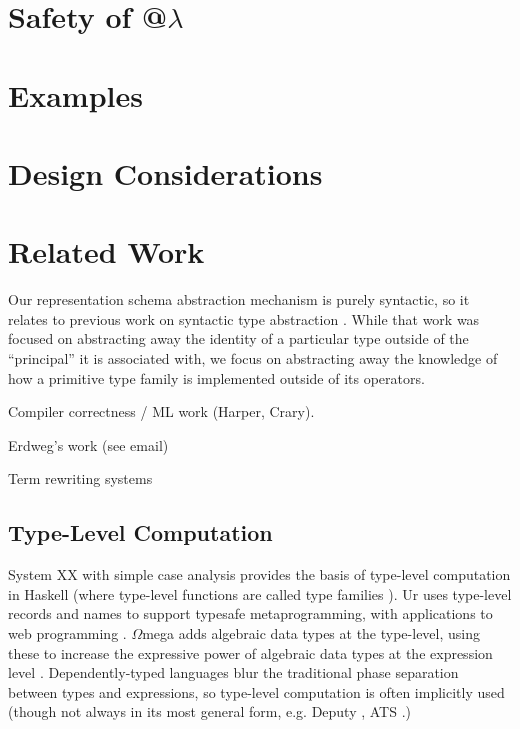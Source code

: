 \documentclass{llncs}
\begin{document}
\section{Safety of @$\lambda$}\label{safety}


\section{Examples}\label{examples}

\section{Design Considerations}\label{design}

\section{Related Work}\label{related-work}
Our representation schema abstraction mechanism is purely syntactic, so it relates to previous work on syntactic type abstraction \cite{syntypeabs}. While that work was focused on abstracting away the identity of a particular type outside of the ``principal'' it is associated with, we focus on abstracting away the knowledge of how a primitive type family is implemented outside of its operators.

Compiler correctness / ML work (Harper, Crary).

Erdweg's work (see email)

Term rewriting systems

\subsection{Type-Level Computation} %
System XX with simple case analysis provides the basis of type-level computation in Haskell (where type-level functions are called type families \cite{Chakravarty:2005:ATC}). Ur uses type-level records and names to support typesafe metaprogramming, with applications to web programming \cite{conf/pldi/Chlipala10}. $\Omega$mega adds algebraic data types at the type-level, using these to increase the expressive power of algebraic data types at the expression level \cite{conf/cefp/SheardL07}. Dependently-typed languages blur the traditional phase separation between types and expressions, so type-level computation is often implicitly used (though not always in its most general form, e.g. Deputy \cite{conf/icfp/ChenX05}, ATS \cite{conf/esop/ConditHAGN07}.)
\end{document}
